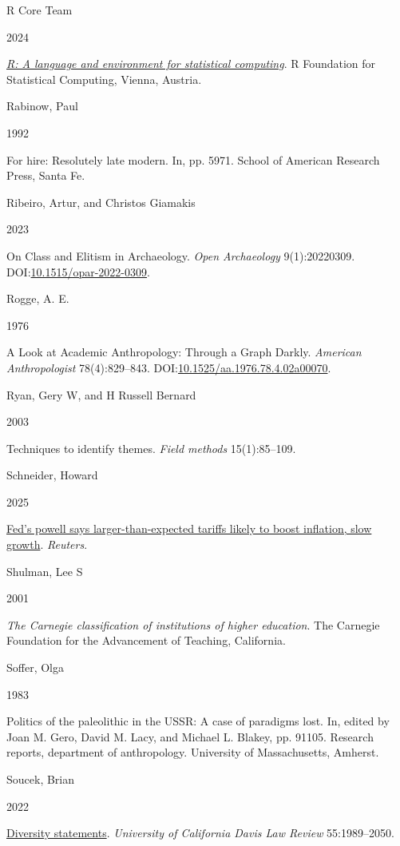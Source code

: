 \documentclass[
  12pt,
]{article}
\newlength{\cslhangindent}
\newlength{\csllabelwidth}
\newenvironment{CSLReferences}[2] %
 {\begin{list}{}{%
  \setlength{\itemindent}{0pt}
  \setlength{\leftmargin}{0pt}
  \setlength{\parsep}{0pt}
  \ifodd #1
   \setlength{\leftmargin}{\cslhangindent}
   \setlength{\itemindent}{-1\cslhangindent}
  \fi
  \setlength{\itemsep}{#2\baselineskip}}}
 {\end{list}}
\newcommand{\CSLBlock}[1]{\hfill\break\parbox[t]{\linewidth}{\strut\ignorespaces#1\strut}}
\newcommand{\CSLLeftMargin}[1]{\parbox[t]{\csllabelwidth}{\strut#1\strut}}
\newcommand{\CSLRightInline}[1]{\parbox[t]{\linewidth - \csllabelwidth}{\strut#1\strut}}
\begin{document}
\begin{CSLReferences}{0}{1}
\CSLBlock{R Core Team}
\CSLLeftMargin{ 2024}%
\CSLRightInline{\emph{\href{https://www.R-project.org/}{R: A language
and environment for statistical computing}}. R Foundation for
Statistical Computing, Vienna, Austria.}

\CSLBlock{Rabinow, Paul}
\CSLLeftMargin{ 1992}%
\CSLRightInline{For hire: Resolutely late modern. In, pp. 5971. School
of American Research Press, Santa Fe.}

\CSLBlock{Ribeiro, Artur, and Christos Giamakis}
\CSLLeftMargin{ 2023}%
\CSLRightInline{On Class and Elitism in Archaeology. \emph{Open
Archaeology} 9(1):20220309.
DOI:\href{https://doi.org/10.1515/opar-2022-0309}{10.1515/opar-2022-0309}.}

\CSLBlock{Rogge, A. E.}
\CSLLeftMargin{ 1976}%
\CSLRightInline{A Look at Academic Anthropology: Through a Graph Darkly.
\emph{American Anthropologist} 78(4):829--843.
DOI:\href{https://doi.org/10.1525/aa.1976.78.4.02a00070}{10.1525/aa.1976.78.4.02a00070}.}

\CSLBlock{Ryan, Gery W, and H Russell Bernard}
\CSLLeftMargin{ 2003}%
\CSLRightInline{Techniques to identify themes. \emph{Field methods}
15(1):85--109.}

\CSLBlock{Schneider, Howard}
\CSLLeftMargin{ 2025}%
\CSLRightInline{\href{https://www.reuters.com/markets/us/feds-powell-weigh-amid-tariff-fray-market-drop-2025-04-04/}{Fed{'}s
powell says larger-than-expected tariffs likely to boost inflation, slow
growth}. \emph{Reuters}.}

\CSLBlock{Shulman, Lee S}
\CSLLeftMargin{ 2001}%
\CSLRightInline{\emph{The {C}arnegie classification of institutions of
higher education}. The Carnegie Foundation for the Advancement of
Teaching, California.}

\CSLBlock{Soffer, Olga}
\CSLLeftMargin{ 1983}%
\CSLRightInline{Politics of the paleolithic in the USSR: A case of
paradigms lost. In, edited by Joan M. Gero, David M. Lacy, and Michael
L. Blakey, pp. 91105. Research reports, department of anthropology.
University of Massachusetts, Amherst.}

\CSLBlock{Soucek, Brian}
\CSLLeftMargin{ 2022}%
\CSLRightInline{\href{https://lawreview.law.ucdavis.edu/archives/55/4/diversity-statements.html}{Diversity
statements}. \emph{University of California Davis Law Review}
55:1989--2050.}


\end{CSLReferences}
\end{document}
